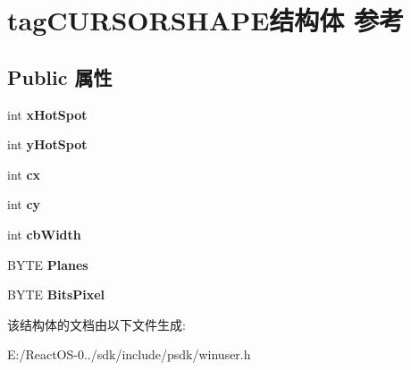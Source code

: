 \hypertarget{structtag_c_u_r_s_o_r_s_h_a_p_e}{}\section{tag\+C\+U\+R\+S\+O\+R\+S\+H\+A\+P\+E结构体 参考}
\label{structtag_c_u_r_s_o_r_s_h_a_p_e}
\subsection*{Public 属性}
\begin{DoxyCompactItemize}
\item 
\mbox{\label{structtag_c_u_r_s_o_r_s_h_a_p_e_ab13687e7bce6ed9f2272b223247d433d}} 
int {\bfseries x\+Hot\+Spot}
\item 
\mbox{\label{structtag_c_u_r_s_o_r_s_h_a_p_e_aa893e25b6a3025469e90762042f46a5f}} 
int {\bfseries y\+Hot\+Spot}
\item 
\mbox{\label{structtag_c_u_r_s_o_r_s_h_a_p_e_a67e706580eb1256a83d54301078b240f}} 
int {\bfseries cx}
\item 
\mbox{\label{structtag_c_u_r_s_o_r_s_h_a_p_e_ab5213f87758405875889489055977309}} 
int {\bfseries cy}
\item 
\mbox{\label{structtag_c_u_r_s_o_r_s_h_a_p_e_a21f85094cd0629a73d5ee234026d86ef}} 
int {\bfseries cb\+Width}
\item 
\mbox{\label{structtag_c_u_r_s_o_r_s_h_a_p_e_a42102f5e18cd1aaebcdc739af9438c09}} 
B\+Y\+TE {\bfseries Planes}
\item 
\mbox{\label{structtag_c_u_r_s_o_r_s_h_a_p_e_a63b4214580aaebef28d6010fb1f8dfdb}} 
B\+Y\+TE {\bfseries Bits\+Pixel}
\end{DoxyCompactItemize}


该结构体的文档由以下文件生成\+:\begin{DoxyCompactItemize}
\item 
E\+:/\+React\+O\+S-\/0../sdk/include/psdk/winuser.\+h\end{DoxyCompactItemize}

